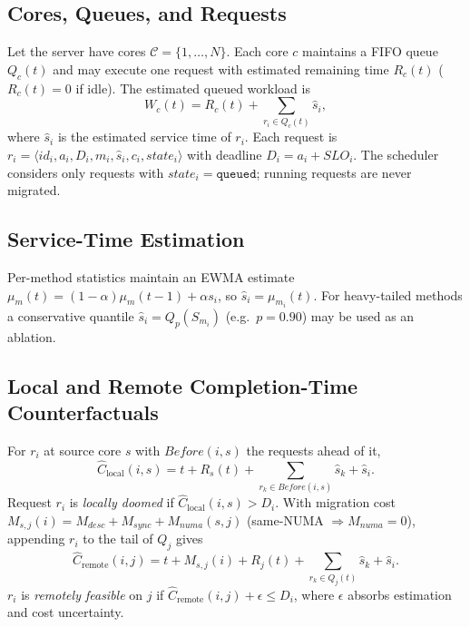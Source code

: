 \subsection{Cores, Queues, and Requests}
Let the server have cores $\mathcal{C}=\{1,\dots,N\}$. Each core $c$
maintains a FIFO queue $Q_c(t)$ and may execute one request with
estimated remaining time $R_c(t)$ ($R_c(t){=}0$ if idle). The estimated
queued workload is
\begin{equation}
W_c(t) = R_c(t) + \sum_{r_i \in Q_c(t)} \hat{s}_i ,
\end{equation}
where $\hat{s}_i$ is the estimated service time of $r_i$. Each request is
$r_i=\langle id_i,a_i,D_i,m_i,\hat{s}_i,c_i,state_i\rangle$ with deadline
$D_i=a_i+SLO_i$. The scheduler considers only requests with
$state_i=\texttt{queued}$; running requests are never migrated.

\subsection{Service-Time Estimation}
Per-method statistics maintain an EWMA estimate
$\mu_m(t)=(1-\alpha)\mu_m(t-1)+\alpha s_i$, so $\hat{s}_i=\mu_{m_i}(t)$.
For heavy-tailed methods a conservative quantile $\hat{s}_i=Q_p(S_{m_i})$
(e.g.\ $p{=}0.90$) may be used as an ablation.

\subsection{Local and Remote Completion-Time Counterfactuals}
For $r_i$ at source core $s$ with $Before(i,s)$ the requests ahead of it,
\begin{equation}
\hat{C}_{\text{local}}(i,s)= t + R_s(t)
  + \!\!\sum_{r_k \in Before(i,s)}\!\! \hat{s}_k + \hat{s}_i .
\end{equation}
Request $r_i$ is \emph{locally doomed} if
$\hat{C}_{\text{local}}(i,s) > D_i$. With migration cost
$M_{s,j}(i)=M_{desc}+M_{sync}+M_{numa}(s,j)$ (same-NUMA
$\Rightarrow M_{numa}{=}0$), appending $r_i$ to the tail of $Q_j$ gives
\begin{equation}
\hat{C}_{\text{remote}}(i,j)= t + M_{s,j}(i) + R_j(t)
  + \!\!\sum_{r_k \in Q_j(t)}\!\! \hat{s}_k + \hat{s}_i .
\end{equation}
$r_i$ is \emph{remotely feasible} on $j$ if
$\hat{C}_{\text{remote}}(i,j)+\epsilon \le D_i$, where $\epsilon$ absorbs
estimation and cost uncertainty.

